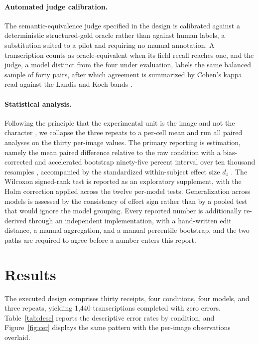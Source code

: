\documentclass[11pt]{article}
\begin{document}
\paragraph{Automated judge calibration.}
The semantic-equivalence judge specified in the design is calibrated against a deterministic
structured-gold oracle rather than against human labels, a substitution suited to a pilot and
requiring no manual annotation. A transcription counts as oracle-equivalent when its field recall
reaches one, and the judge, a model distinct from the four under evaluation, labels the same balanced
sample of forty pairs, after which agreement is summarized by Cohen's kappa read against the Landis
and Koch bands \citep{landis1977kappa,zheng2023judge}.

\paragraph{Statistical analysis.}
Following the principle that the experimental unit is the image and not the character
\citep{hurlbert1984pseudoreplication}, we collapse the three repeats to a per-cell mean and run all
paired analyses on the thirty per-image values. The primary reporting is estimation, namely the mean
paired difference relative to the raw condition with a bias-corrected and accelerated bootstrap
ninety-five percent interval over ten thousand resamples \citep{efron1993bootstrap}, accompanied by
the standardized within-subject effect size $d_z$ \citep{lakens2013effectsizes,cohen1988power}. The
Wilcoxon signed-rank test \citep{wilcoxon1945} is reported as an exploratory supplement, with the
Holm correction applied across the twelve per-model tests. Generalization across models is assessed
by the consistency of effect sign rather than by a pooled test that would ignore the model grouping.
Every reported number is additionally re-derived through an independent implementation, with a
hand-written edit distance, a manual aggregation, and a manual percentile bootstrap, and the two
paths are required to agree before a number enters this report.

\section{Results}

The executed design comprises thirty receipts, four conditions, four models, and three repeats,
yielding 1{,}440 transcriptions completed with zero errors. Table~\ref{tab:desc} reports the
descriptive error rates by condition, and Figure~\ref{fig:cer} displays the same pattern with the
per-image observations overlaid.
\end{document}
